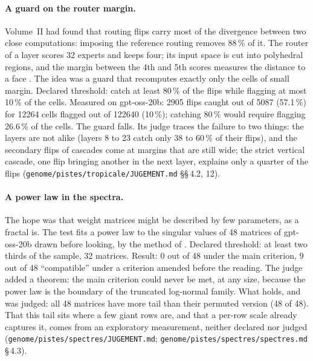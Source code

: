 \documentclass[11pt, a4paper]{article}
\theoremstyle{remark}
\newcommand{\fichier}[1]{\textsf{\footnotesize\nolinkurl{#1}}}
\begin{document}
\paragraph{A guard on the router margin.} Volume~II had found that routing flips carry most of the divergence between two close computations: imposing the reference routing removes 88\,\% of it. The router of a layer scores 32 experts and keeps four; its input space is cut into polyhedral regions, and the margin between the 4th and 5th scores measures the distance to a face \citep{zhang2018tropical}. The idea was a guard that recomputes exactly only the cells of small margin. Declared threshold: catch at least 80\,\% of the flips while flagging at most 10\,\% of the cells. Measured on gpt-oss-20b: \num{2905} flips caught out of \num{5087} (57.1\,\%) for \num{12264} cells flagged out of \num{122640} (10\,\%); catching 80\,\% would require flagging 26.6\,\% of the cells. The guard falls. Its judge traces the failure to two things: the layers are not alike (layers 8 to 23 catch only 38 to 60\,\% of their flips), and the secondary flips of cascades come at margins that are still wide; the strict vertical cascade, one flip bringing another in the next layer, explains only a quarter of the flips (\fichier{genome/pistes/tropicale/JUGEMENT.md} §§\,4.2, 12).

\paragraph{A power law in the spectra.} The hope was that weight matrices might be described by few parameters, as a fractal is. The test fits a power law to the singular values of 48 matrices of gpt-oss-20b drawn before looking, by the method of \citet{clauset2009power}. Declared threshold: at least two thirds of the sample, 32 matrices. Result: 0 out of 48 under the main criterion, 9 out of 48 ``compatible'' under a criterion amended before the reading. The judge added a theorem: the main criterion could never be met, at any size, because the power law is the boundary of the truncated log-normal family. What holds, and was judged: all 48 matrices have more tail than their permuted version (48 of 48). That this tail sits where a few giant rows are, and that a per-row scale already captures it, comes from an exploratory measurement, neither declared nor judged (\fichier{genome/pistes/spectres/JUGEMENT.md}; \fichier{genome/pistes/spectres/spectres.md} §\,4.3).
\end{document}

